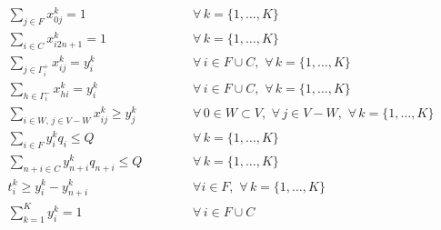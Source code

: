\documentclass[12pt]{article}
\begin{document}
\begin{eqnarray}
\label{eq01}
  \sum\limits_{j \in F} {x^k_{0j}} = 1 & \hspace{1cm} & \forall \, k = \{1, \dots , K\}\\
\label{eq02}
  \sum\limits_{i \in C} {x^k_{i2n+1}} = 1 & \hspace{1cm} & \forall \, k = \{1, \dots , K\}\\
\label{eq03}
  \sum\limits_{j \in \Gamma^+_i} {x^k_{ij}} = y^k_i & \hspace{1cm} & \forall \, i \in F \cup C, \,\, \forall \, k = \{1, \dots , K\}\\
\label{eq04}
  \sum\limits_{h \in \Gamma^-_i} {x^k_{hi}} = y^k_i & \hspace{1cm} & \forall \, i \in F \cup C, \,\, \forall \, k = \{1, \dots , K\}\\
\label{eq05}
  \sum\limits_{i \in W, \, j \in V-W}{x^k_{ij}} \ge y^k_j  & \hspace{1cm} & 
  	\forall \, 0 \in W \subset V, \,\, \forall \, j \in V-W, \,\, \forall \, k = \{1, \dots , K\} \\
\label{eq06}
  \sum\limits_{i \in F} {y^k_i q_i} \le Q & \hspace{1cm} & \forall \, k = \{1, \dots , K\}\\
\label{eq07}
  \sum\limits_{n+i \in C} {y^k_{n+i} q_{n+i}} \le Q & \hspace{1cm} & \forall \, k = \{1, \dots , K\}\\
\label{eq08}
  t^k_i \ge y^k_i - y^k_{n+i} & \hspace{1cm} &\forall i \in F, \,\, \forall \, k = \{1, \dots , K\} \\
\label{eq09}
  \sum\limits_{k=1}^{K} {y^k_i} = 1 & \hspace{1cm} & \forall \, i \in F \cup C
\end{eqnarray}
\end{document}
